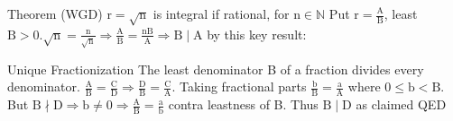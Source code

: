 Theorem (WGD) $\mathrm{r}=\sqrt{\mathrm{n}}$ is integral if rational, for $\mathrm{n} \in \mathbb{N}$
\et
\ba
Put $\mathrm{r}=\frac{\mathrm{A}}{\mathrm{B}}$, least $\mathrm{B}>0 . \sqrt{\mathrm{n}}=\frac{\mathrm{n}}{\sqrt{\mathrm{n}}} \Rightarrow \frac{\mathrm{A}}{\mathrm{B}}=\frac{\mathrm{nB}}{\mathrm{A}} \Rightarrow \mathrm{B} \mid \mathrm{A}$ by this key result:
\ea

Unique Fractionization The least denominator B of a fraction divides every denominator. 
\et
\ba
$\frac{\mathrm{A}}{\mathrm{B}}=\frac{\mathrm{C}}{\mathrm{D}} \Rightarrow \frac{\mathrm{D}}{\mathrm{B}}=\frac{\mathrm{C}}{\mathrm{A}}$. Taking fractional parts $\frac{\mathrm{b}}{\mathrm{B}}=\frac{\mathrm{a}}{\mathrm{A}}$ where $0 \leq \mathrm{b}<\mathrm{B}$. But $\mathrm{B} \nmid \mathrm{D} \Rightarrow \mathrm{b} \neq 0 \Rightarrow \frac{\mathrm{A}}{\mathrm{B}}=\frac{\mathrm{a}}{\mathrm{b}}$ contra leastness of B. Thus $\mathrm{B} \mid \mathrm{D}$ as claimed QED
\ea